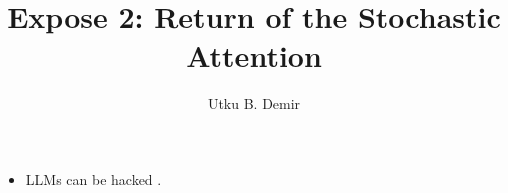 
\title{Expose 2: Return of the Stochastic Attention}
\author{Utku B. Demir}


\maketitle

\begin{itemize}
	\item LLMs can be hacked \parencite[page]{chu2024}.
\end{itemize}




\printbibliography

